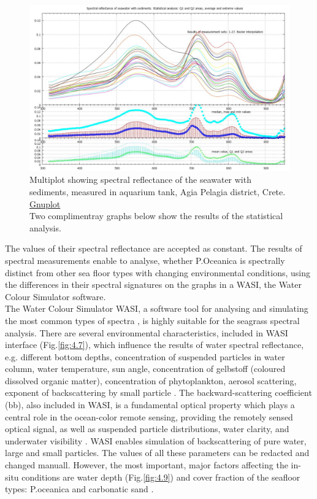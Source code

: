 \documentclass[10pt, a4paper]{article}
\begin{document}
\begin{figure}[H]
	\centering
	\includegraphics[scale=0.30]{GNU-18.jpg}
	\caption{Multiplot showing spectral reflectance of the seawater with sediments, measured in aquarium tank, Agia Pelagia district, Crete. \href{http://www.gnuplot.info/}{Gnuplot} \\Two complimentray graphs below show the results of the statistical analysis.}
	\label{fig:4.4}
\end{figure}

The values of their spectral reflectance are accepted as constant. The results of
spectral measurements enable to analyse, whether P.Oceanica is spectrally distinct from other sea
floor types with changing environmental conditions, using the differences in their spectral signatures
on the graphs in a WASI, the Water Colour Simulator software. \\The Water Colour Simulator WASI, a
software tool for analysing and simulating the most common types of spectra \cite{Gege05}\label{Gege05}, is highly
suitable for the seagrass spectral analysis.
There are several environmental characteristics, included in WASI interface (Fig.\ref{fig:4.7}), which influence the
results of water spectral reflectance, e.g. different bottom depths, concentration of suspended particles
in water column, water temperature, sun angle, concentration of gelbstoff (coloured dissolved organic
matter), concentration of phytoplankton, aerosol scattering, exponent of backscattering by small
particle \cite{Gege04}\label{Gege04}. The backward-scattering coefficient (bb), also included in WASI, is a
fundamental optical property which plays a central role in the ocean-color remote sensing, providing
the remotely sensed optical signal, as well as suspended particle distributions, water clarity, and
underwater visibility \cite{Maffione97}\label{Maffione97}. WASI enables simulation of backscattering of pure
water, large and small particles. The values of all these parameters can be redacted and changed
manuall. However, the most important, major factors affecting the in-situ conditions are water depth (Fig.\ref{fig:4.9})
and cover fraction of the seafloor types: P.oceanica and carbonatic sand .
\end{document}

